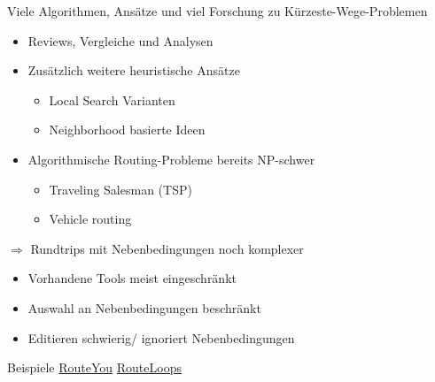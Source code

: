 \documentclass[aspectratio=169,xcolor=dvipsnames, t]{beamer}
\begin{document}
	\begin{frame}
		\vspace{0.5cm}
		Viele Algorithmen, Ansätze und viel  Forschung zu Kürzeste-Wege-Problemen
		\pause
		\begin{itemize}[<+->]
			\item Reviews, Vergleiche und Analysen \cite{madkourSurveyShortestPathAlgorithms2017, sommerShortestpathQueriesStatic2014, wayahdiGreedyAStarDijkstra2021}
			\item Zusätzlich weitere heuristische Ansätze
			\begin{itemize}[<+->]
				\item Local Search Varianten \cite{braysyVehicleRoutingProblem2005, irnichSequentialSearchIts2006, ropkeHeuristicExactAlgorithms2005}
				\item Neighborhood basierte Ideen \cite{braysyVehicleRoutingProblem2005, irnichSequentialSearchIts2006, ropkeHeuristicExactAlgorithms2005}
			\end{itemize} 
		\item Algorithmische Routing-Probleme  bereits NP-schwer \cite{reineltTravelingSalesmanComputational2003}
		\begin{itemize}[<+->]
			\item Traveling Salesman (TSP)\cite{gendreauHandbookMetaheuristics2010} 
			\item Vehicle routing \cite{braysyVehicleRoutingProblem2005, irnichSequentialSearchIts2006}
		\end{itemize}
		\end{itemize}
		\pause
		
		$\Rightarrow$ Rundtrips mit Nebenbedingungen noch komplexer \cite{gemsaEfficientComputationJogging2013}
		\pause
		\begin{itemize}[<+->]
			\item Vorhandene Tools meist eingeschränkt
			\item Auswahl an Nebenbedingungen beschränkt
			\item Editieren schwierig/ ignoriert Nebenbedingungen
		\end{itemize}
	\end{frame}
	
	\begin{frame}{Beispiele}
		\centering
		\vspace{2.5cm}
		\Huge
		\only<1> {\href{https://www.routeyou.com}{RouteYou}}
		\only<2> {\href{https://www.routeloops.com/}{RouteLoops}}
	\end{frame}
	
\end{document}
